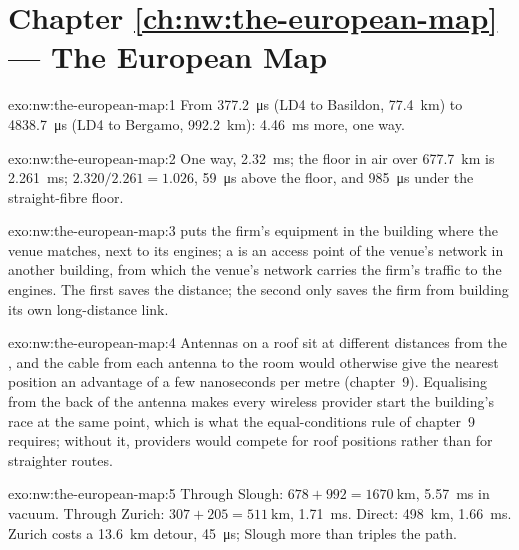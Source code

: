 \section*{Chapter \ref{ch:nw:the-european-map} --- The European Map}

\begin{solution}{exo:nw:the-european-map:1}
From \qty{377.2}{\micro\second} (LD4 to Basildon, \qty{77.4}{\kilo\metre}) to \qty{4838.7}{\micro\second} (LD4 to Bergamo,
\qty{992.2}{\kilo\metre}): \qty{4.46}{\milli\second} more, one way.
\end{solution}

\begin{solution}{exo:nw:the-european-map:2}
One way, \qty{2.32}{\milli\second}; the floor in air over \qty{677.7}{\kilo\metre} is \qty{2.261}{\milli\second}; $2.320/2.261 = 1.026$,
\qty{59}{\micro\second} above the floor, and \qty{985}{\micro\second} under the straight-fibre floor.
\end{solution}

\begin{solution}{exo:nw:the-european-map:3}
 puts the firm's equipment in the building where the venue matches, next to its engines; a  is an access point of
the venue's network in another building, from which the venue's network carries the firm's traffic to the engines. The first saves the
distance; the second only saves the firm from building its own long-distance link.
\end{solution}

\begin{solution}{exo:nw:the-european-map:4}
Antennas on a roof sit at different distances from the , and the cable from each antenna to the room would otherwise give the
nearest position an advantage of a few nanoseconds per metre (chapter~9). Equalising from the back of the antenna makes every wireless
provider start the building's race at the same point, which is what the equal-conditions rule of chapter~9 requires; without it, providers
would compete for roof positions rather than for straighter routes.
\end{solution}

\begin{solution}{exo:nw:the-european-map:5}
Through Slough: $678 + 992 = \qty{1670}{\kilo\metre}$, \qty{5.57}{\milli\second} in vacuum. Through Zurich: $307 + 205 = \qty{511}{\kilo\metre}$,
\qty{1.71}{\milli\second}. Direct: \qty{498}{\kilo\metre}, \qty{1.66}{\milli\second}. Zurich costs a \qty{13.6}{\kilo\metre} detour,
\qty{45}{\micro\second}; Slough more than triples the path.
\end{solution}

